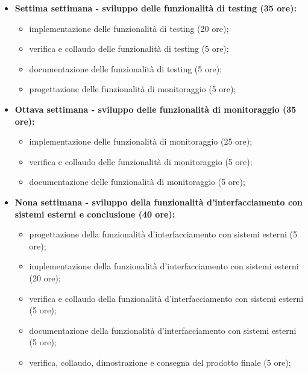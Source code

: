 {\begin{itemize}
\begin{itemize}
            \item verifica e collaudo dell'applicazione di testing e monitoraggio (5 ore);
            \item documentazione dell'applicazione di testing e monitoraggio (5 ore);
            \item progettazione delle funzionalità di testing (5 ore);
            \item implementazione delle funzionalità di testing (5 ore);
        \end{itemize}
        \item \textbf{Settima settimana - sviluppo delle funzionalità di testing (35 ore):} 
        \begin{itemize}
            \item implementazione delle funzionalità di testing (20 ore);
            \item verifica e collaudo delle funzionalità di testing (5 ore);
            \item documentazione delle funzionalità di testing (5 ore);
            \item progettazione delle funzionalità di monitoraggio (5 ore);
        \end{itemize}
        \item \textbf{Ottava settimana - sviluppo delle funzionalità di monitoraggio (35 ore):} 
        \begin{itemize}
            \item implementazione delle funzionalità di monitoraggio (25 ore);
            \item verifica e collaudo delle funzionalità di monitoraggio (5 ore);
            \item documentazione delle funzionalità di monitoraggio (5 ore);
        \end{itemize}
        \item \textbf{Nona settimana - sviluppo della funzionalità d'interfacciamento con sistemi esterni e conclusione (40 ore):} 
        \begin{itemize}
            \item progettazione della funzionalità d'interfacciamento con sistemi esterni (5 ore);
            \item implementazione della funzionalità d'interfacciamento con sistemi esterni (20 ore);
            \item verifica e collaudo della funzionalità d'interfacciamento con sistemi esterni (5 ore);
            \item documentazione della funzionalità d'interfacciamento con sistemi esterni (5 ore);
            \item verifica, collaudo, dimostrazione e consegna del prodotto finale (5 ore);
        \end{itemize}
    \end{itemize}
}

